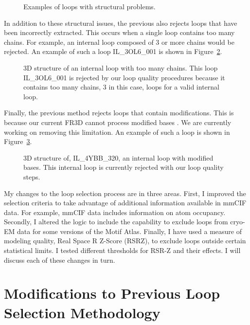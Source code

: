 \begin{figure}
  \caption{Examples of loops with structural problems.}
  \label{fig:loops-with-issues}
\end{figure}

In addition to these structural issues, the previous also rejects loops that
have been incorrectly extracted. This occurs when a single loop contains too
many chains. For example, an internal loop composed of 3 or more chains would be
rejected. An example of such a loop IL\_3OL6\_001 is shown in
Figure~\ref{fig:too-many-chains}.

\begin{figure}
  \caption{3D structure of an internal loop with too many chains. This loop
    IL\_3OL6\_001 is rejected by our loop quality procedures because it contains
    too many chains, 3 in this case, loops for a valid internal loop.}
  \label{fig:too-many-chains}
\end{figure}

Finally, the previous method rejects loops that contain modifications. This is
because our current FR3D cannot process modified bases \cite{Sarver2008a}. We are
currently working on removing this limitation. An example of such a loop is
shown in Figure~\ref{fig:modified-loop}.

\begin{figure}
  \caption{3D structure of, IL\_4YBB\_320, an internal loop with modified bases.
  This internal loop is currently rejected with our loop quality steps.}
  \label{fig:modified-loop}
\end{figure}

My changes to the loop selection process are in three areas. First, I improved
the selection criteria to take advantage of additional information available in
mmCIF data. For example, mmCIF data includes information on atom occupancy.
Secondly, I altered the logic to include the capability to exclude loops from
cryo-EM data for some versions of the Motif Atlas. Finally, I have used a
measure of modeling quality, Real Space R Z-Score (RSRZ), to exclude loops
outside certain statistical limits. I tested different thresholds for RSR-Z and
their effects. I will discuss each of these changes in turn.

\section{Modifications to Previous Loop Selection Methodology}

